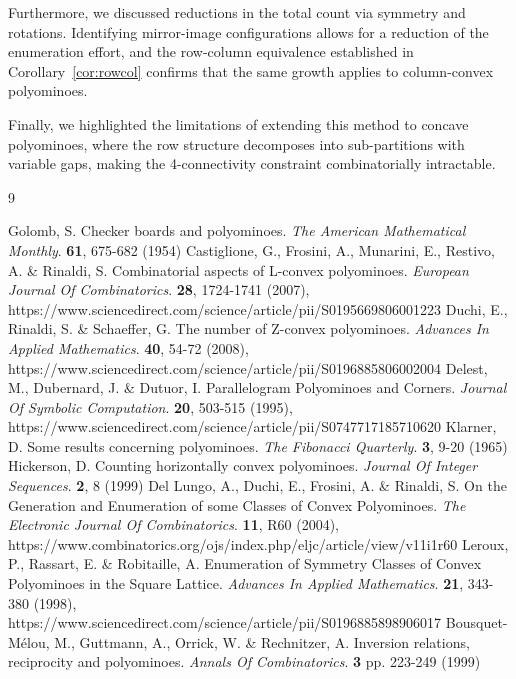 \documentclass{article}
\theoremstyle{definition}
\theoremstyle{plain}
\begin{document}
Furthermore, we discussed reductions in the total count via symmetry and 
rotations. Identifying mirror-image configurations allows for a reduction 
of the enumeration effort, and the row-column equivalence established in 
Corollary~\ref{cor:rowcol} confirms that the same growth applies to 
column-convex polyominoes.

Finally, we highlighted the limitations of extending this method to 
concave polyominoes, where the row structure decomposes into sub-partitions 
with variable gaps, making the 4-connectivity constraint combinatorially 
intractable.

\begin{thebibliography}{9}

Golomb, S. Checker boards and polyominoes. {\em The American Mathematical Monthly}. \textbf{61}, 675-682 (1954)
Castiglione, G., Frosini, A., Munarini, E., Restivo, A. \& Rinaldi, S. Combinatorial aspects of L-convex polyominoes. {\em European Journal Of Combinatorics}. \textbf{28}, 1724-1741 (2007), https://www.sciencedirect.com/science/article/pii/S0195669806001223
Duchi, E., Rinaldi, S. \& Schaeffer, G. The number of Z-convex polyominoes. {\em Advances In Applied Mathematics}. \textbf{40}, 54-72 (2008), https://www.sciencedirect.com/science/article/pii/S0196885806002004
Delest, M., Dubernard, J. \& Dutuor, I. Parallelogram Polyominoes and Corners. {\em Journal Of Symbolic Computation}. \textbf{20}, 503-515 (1995), https://www.sciencedirect.com/science/article/pii/S0747717185710620
Klarner, D. Some results concerning polyominoes. {\em The Fibonacci Quarterly}. \textbf{3}, 9-20 (1965)
Hickerson, D. Counting horizontally convex polyominoes. {\em Journal Of Integer Sequences}. \textbf{2}, 8 (1999)
Del Lungo, A., Duchi, E., Frosini, A. \& Rinaldi, S. On the Generation and Enumeration of some Classes of Convex Polyominoes. {\em The Electronic Journal Of Combinatorics}. \textbf{11}, R60 (2004), https://www.combinatorics.org/ojs/index.php/eljc/article/view/v11i1r60
Leroux, P., Rassart, E. \& Robitaille, A. Enumeration of Symmetry Classes of Convex Polyominoes in the Square Lattice. {\em Advances In Applied Mathematics}. \textbf{21}, 343-380 (1998), https://www.sciencedirect.com/science/article/pii/S0196885898906017
Bousquet-Mélou, M., Guttmann, A., Orrick, W. \& Rechnitzer, A. Inversion relations, reciprocity and polyominoes. {\em Annals Of Combinatorics}. \textbf{3} pp. 223-249 (1999)

\end{thebibliography}
\end{document}
